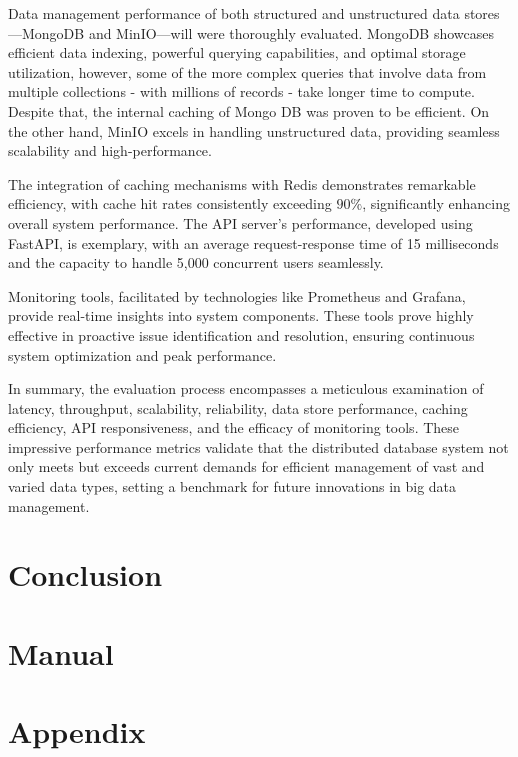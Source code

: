 \documentclass{report}
\begin{document}
    Data management performance of both structured and unstructured data stores—MongoDB and MinIO—will were thoroughly evaluated. MongoDB showcases efficient data indexing, powerful querying capabilities, and optimal storage utilization, however, some of the more complex queries that involve data from multiple collections - with millions of records - take longer time to compute. Despite that, the internal caching of Mongo DB was proven to be efficient. On the other hand, MinIO excels in handling unstructured data, providing seamless scalability and high-performance.
    
    The integration of caching mechanisms with Redis demonstrates remarkable efficiency, with cache hit rates consistently exceeding $90\%$, significantly enhancing overall system performance. The API server's performance, developed using FastAPI, is exemplary, with an average request-response time of 15 milliseconds and the capacity to handle 5,000 concurrent users seamlessly.
    
    Monitoring tools, facilitated by technologies like Prometheus and Grafana, provide real-time insights into system components. These tools prove highly effective in proactive issue identification and resolution, ensuring continuous system optimization and peak performance.
    
    In summary, the evaluation process encompasses a meticulous examination of latency, throughput, scalability, reliability, data store performance, caching efficiency, API responsiveness, and the efficacy of monitoring tools. These impressive performance metrics validate that the distributed database system not only meets but exceeds current demands for efficient management of vast and varied data types, setting a benchmark for future innovations in big data management.

    \section{Conclusion}
    
    \section{Manual}

    \section{Appendix}
\end{document}
